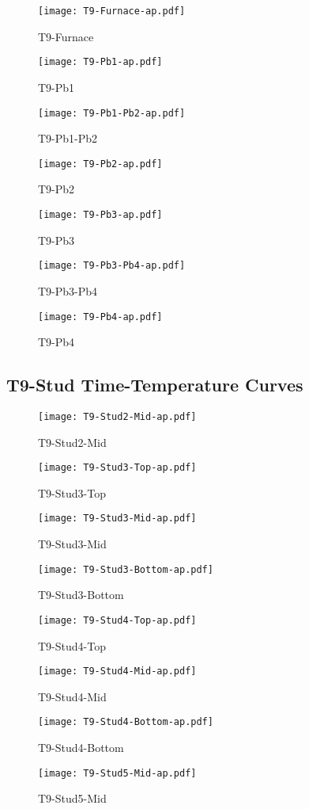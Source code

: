\begin{figure}[htbp]
\centering
	\texttt{[image: T9-Furnace-ap.pdf]}
	\caption*{T9-Furnace}
\end{figure}
\begin{figure}[htbp]
	\centering
		\texttt{[image: T9-Pb1-ap.pdf]}
		\caption*{T9-Pb1}
\end{figure}
\begin{figure}[htbp]
	\centering
		\texttt{[image: T9-Pb1-Pb2-ap.pdf]}
		\caption*{T9-Pb1-Pb2}
\end{figure}
\begin{figure}[htbp]
	\centering
		\texttt{[image: T9-Pb2-ap.pdf]}
		\caption*{T9-Pb2}
\end{figure}
\begin{figure}[htbp]
	\centering
		\texttt{[image: T9-Pb3-ap.pdf]}
		\caption*{T9-Pb3}
\end{figure}
\begin{figure}[htbp]
	\centering
			\texttt{[image: T9-Pb3-Pb4-ap.pdf]}
			\caption*{T9-Pb3-Pb4}
\end{figure}
\begin{figure}[htbp]
	\centering
			\texttt{[image: T9-Pb4-ap.pdf]}
			\caption*{T9-Pb4}
\end{figure}

\pagebreak

\subsection*{T9-Stud Time-Temperature Curves}

\begin{figure}[htbp]
	\centering
			\texttt{[image: T9-Stud2-Mid-ap.pdf]}
			\caption*{T9-Stud2-Mid}
\end{figure}
\begin{figure}[htbp]
	\centering
			\texttt{[image: T9-Stud3-Top-ap.pdf]}
			\caption*{T9-Stud3-Top}
\end{figure}
\begin{figure}[htbp]
	\centering
			\texttt{[image: T9-Stud3-Mid-ap.pdf]}
			\caption*{T9-Stud3-Mid}
\end{figure}
\begin{figure}[htbp]
	\centering
			\texttt{[image: T9-Stud3-Bottom-ap.pdf]}
			\caption*{T9-Stud3-Bottom}
\end{figure}
\begin{figure}[htbp]
	\centering
			\texttt{[image: T9-Stud4-Top-ap.pdf]}
			\caption*{T9-Stud4-Top}
\end{figure}
\begin{figure}[htbp]
	\centering
			\texttt{[image: T9-Stud4-Mid-ap.pdf]}
			\caption*{T9-Stud4-Mid}
\end{figure}
\begin{figure}[htbp]
	\centering
			\texttt{[image: T9-Stud4-Bottom-ap.pdf]}
			\caption*{T9-Stud4-Bottom}
\end{figure}
\begin{figure}[htbp]
	\centering
			\texttt{[image: T9-Stud5-Mid-ap.pdf]}
			\caption*{T9-Stud5-Mid}
\end{figure}

